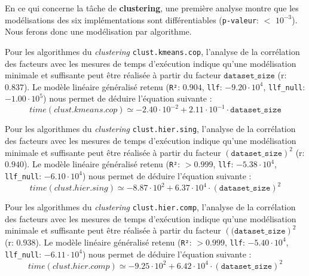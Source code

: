 			
			En ce qui concerne la tâche de \textbf{clustering}, une première analyse montre que les modélisations des six implémentations sont différentiables  (\texttt{p-valeur}: $<$ \texttt{$10^{-3}$}). Nous ferons donc une modélisation par algorithme.
			
			Pour les algorithmes du \textit{clustering} \texttt{clust.kmeans.cop}, l'analyse de la corrélation des facteurs avec les mesures de temps d'exécution indique qu'une modélisation minimale et suffisante peut être réalisée à partir du facteur $\texttt{dataset\_size}$ (r: $0.837$).
			Le modèle linéaire généralisé retenu (\texttt{R²}: $0.904$, \texttt{llf}: $-9.20\cdot10^{4}$, \texttt{llf\_null}: $-1.00\cdot10^{5}$) nous permet de déduire l'équation suivante :
			\begin{equation}
				time(clust.kmeans.cop)
				\simeq -2.40\cdot10^{-2} + 2.11\cdot10^{-1}\cdot\texttt{dataset\_size}
			\end{equation}
			
			Pour les algorithmes du \textit{clustering} \texttt{clust.hier.sing}, l'analyse de la corrélation des facteurs avec les mesures de temps d'exécution indique qu'une modélisation minimale et suffisante peut être réalisée à partir du facteur $(\texttt{dataset\_size})^{2}$ (r: $0.940$).
			Le modèle linéaire généralisé retenu (\texttt{R²}: $> 0.999$, \texttt{llf}: $-5.38\cdot10^{4}$, \texttt{llf\_null}: $-6.10\cdot10^{4}$) nous permet de déduire l'équation suivante :
			\begin{equation}
				time(clust.hier.sing)
				\simeq -8.87\cdot10^{2} + 6.37\cdot10^{4}\cdot(\texttt{dataset\_size})^{2}
			\end{equation}
			
			Pour les algorithmes du \textit{clustering} \texttt{clust.hier.comp}, l'analyse de la corrélation des facteurs avec les mesures de temps d'exécution indique qu'une modélisation minimale et suffisante peut être réalisée à partir du facteur $(\texttt{(dataset\_size})^{2}$ (r: $0.938$).
			Le modèle linéaire généralisé retenu (\texttt{R²}: $> 0.999$, \texttt{llf}: $-5.40\cdot10^{4}$, \texttt{llf\_null}: $-6.11\cdot10^{4}$) nous permet de déduire l'équation suivante :
			\begin{equation}
				time(clust.hier.comp)
				\simeq -9.25\cdot10^{2} + 6.42\cdot10^{4}\cdot(\texttt{dataset\_size})^{2}
			\end{equation}

